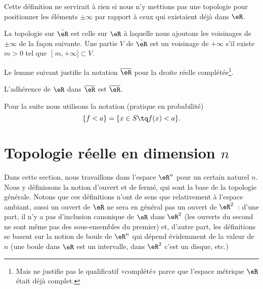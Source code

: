 Cette définition ne servirait à rien si nous n'y mettions pas une topologie pour positionner les éléments \( \pm\infty\) par rapport à ceux qui existaient déjà dans \( \eR\).

\begin{definition}
La topologie sur \(\bar \eR\) est celle sur \( \eR\) à laquelle nous ajoutons les voisinages de \( \pm\infty\) de la façon suivante. Une partie \( V\) de \( \bar \eR\) est un voisinage de \( +\infty\) s'il existe \( m>0\) tel que \( \mathopen] m , +\infty \mathclose]\subset V\).
\end{definition}

Le lemme suivant justifie la notation \( \overline{ \eR }\) pour la droite réelle complétée\footnote{Mais ne justifie pas le qualificatif «complété» parce que l'espace métrique \( \eR\) était déjà complet.}.
\begin{lemma}       \label{LEMooPZXHooEEXsTC}
    L'adhérence de \( \eR\) dans \( \overline{ \eR }\) est \( \overline{ \eR }\).
\end{lemma}

Pour la suite nous utilisons la notation (pratique en probabilité)
\begin{equation}
    \{ f<a \}=\{ x\in S\tq f(x)<a \}.
\end{equation}

\section{Topologie réelle en dimension $n$}

Dans cette section, nous travaillons dans l'espace $\eR^n$ pour un certain naturel $n$. Nous y définissons la notion d'ouvert et de fermé, qui sont la base de la topologie générale. Notons que ces définitions n'ont de sens que relativement à l'espace ambiant, aussi un ouvert de $\eR$ ne sera en général pas un ouvert de $\eR^2$~: d'une part, il n'y a pas d'inclusion canonique de $\eR$ dans $\eR^2$ (les ouverts du second ne sont même pas des sous-ensembles du premier) et, d'autre part, les définitions se basent sur la notion de boule de $\eR^n$ qui dépend évidemment de la valeur de $n$ (une boule dans $\eR$ est un intervalle, dans $\eR^2$ c'est un disque, etc.)

